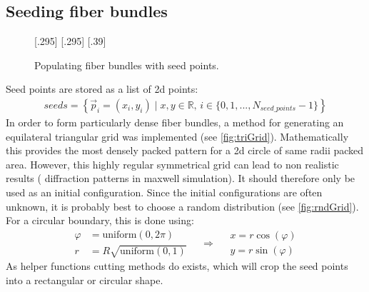 \subsection{Seeding fiber bundles}\label{sec:seeds}
% 
\begin{figure}[!t]
    \def\tikzheight{0.25\textwidth}
    \centering
    [.295\textwidth]{
    \hfill}
    [.295\textwidth]{
    }\hfill
    [.39\textwidth]{
    }
	\caption{Populating fiber bundles with seed points.}
\end{figure}
% 
Seed points are stored as a list of 2d points:
\begin{align}
\mathit{seeds} = \left\{ \vec{p}_i=(x_i,y_i) \mid x,y \in \mathbb{R} , \, i \in \{0,1,...,N_{\mathit{seed\_points}}-1\}\right\}
\end{align}
% 
In order to form particularly dense fiber bundles, a method for generating an equilateral triangular grid was implemented (see \ref{fig:triGrid}).
Mathematically this provides the most densely packed pattern for a 2d circle of same radii packed area.
However, this highly regular symmetrical grid can lead to non realistic results (\eg{} diffraction patterns in maxwell simulation).
It should therefore only be used as an initial configuration.
Since the initial configurations are often unknown, it is probably best to choose a random distribution (see \cref{fig:rndGrid}).
For a circular boundary, this is done using:
\begin{equation}
\begin{split}
\varphi &= \mathrm{uniform}(0,2 \pi) \\
r &= R \sqrt{\mathrm{uniform}(0,1)}
\end{split}
\quad\Rightarrow\quad
\begin{split}
x = r \cos(\varphi)\\
y = r \sin(\varphi)
\end{split}
\end{equation}
% 
As helper functions cutting methods do exists, which will crop the seed points into a rectangular or circular shape.
% 
% 
% 

